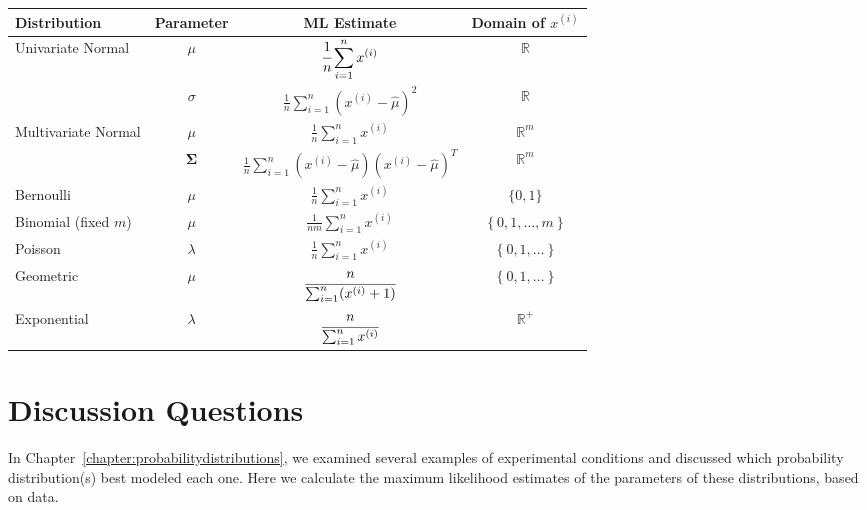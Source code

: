 \begin{center}
\begin{tabular}{lccc}
\toprule
Distribution & Parameter & ML Estimate & Domain of $x^{(i)}$ \\
\midrule
Univariate Normal & $\mu$ & $\displaystyle \cfrac{1}{n} \sum_{i=1}^n x^{(i)}$  & $\mathbb{R}$ \\
& $\sigma$ & $\displaystyle \frac{1}{n} \sum_{i=1}^n \left(x^{(i)} - \hat{\mu}\right)^2 $ & $\mathbb{R}$ \\
Multivariate Normal & $\mu$ & $\displaystyle \frac{1}{n} \sum_{i=1}^n x^{(i)}$ & $\mathbb{R}^m$ \\
& $\boldsymbol\Sigma$ & $\displaystyle \frac{1}{n} \sum_{i=1}^n (x^{(i)}-\hat{\mu})(x^{(i)}-\hat{\mu})^T$ & $\mathbb{R}^m$ \\
Bernoulli & $\mu$ & $\displaystyle \frac{1}{n} \sum_{i=1}^n x^{(i)}$ & $\{0, 1\}$ \\
Binomial (fixed $m$) & $\mu$ & $\displaystyle \frac{1}{nm} \sum_{i=1}^n x^{(i)}$ & $\left\{ 0, 1, \dots, m \right\}$ \\
Poisson & $\lambda$ & $\displaystyle \frac{1}{n} \sum_{i=1}^n x^{(i)}$ & $\left\{ 0, 1, \dots \right\}$\\
Geometric & $\mu$ & $\displaystyle \cfrac{n}{\sum_{i=1}^n (x^{(i)} + 1)} $ & $\left\{ 0, 1, \dots \right\}$ \\
Exponential & $\lambda$ & $\displaystyle \cfrac{n}{\sum_{i=1}^n x^{(i)}} $ & $\mathbb{R}^+$ \\
\bottomrule
\end{tabular}
\end{center}

\section{Discussion Questions}

In Chapter~\ref{chapter:probabilitydistributions}, we examined several examples of experimental conditions and discussed which probability distribution(s) best modeled each one. Here we calculate the maximum likelihood estimates of the parameters of these distributions, based on data.


